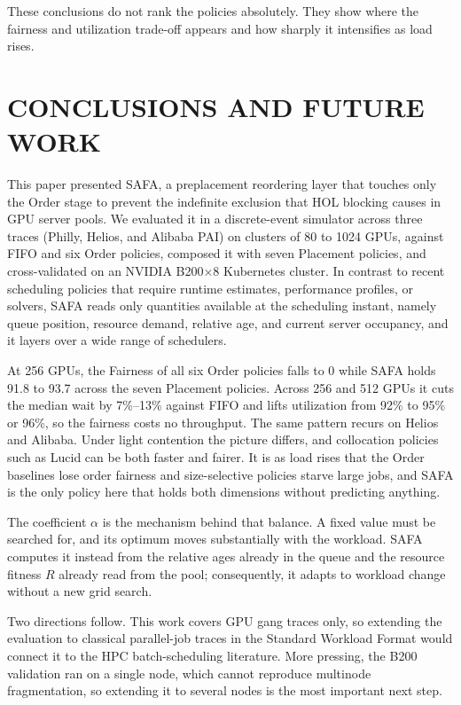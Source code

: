 \documentclass{ieeetj}
\begin{document}
These conclusions do not rank the policies absolutely. They show where the fairness and utilization trade-off appears and how sharply it intensifies as load rises.

\FloatBarrier

\section{CONCLUSIONS AND FUTURE WORK}\label{conclu}

This paper presented SAFA, a preplacement reordering layer that touches only the Order stage to prevent the indefinite exclusion that HOL blocking causes in GPU server pools. We evaluated it in a discrete-event simulator across three traces (Philly, Helios, and Alibaba PAI) on clusters of 80 to 1024 GPUs, against FIFO and six Order policies, composed it with seven Placement policies, and cross-validated on an NVIDIA B200$\times$8 Kubernetes cluster. In contrast to recent scheduling policies that require runtime estimates, performance profiles, or solvers, SAFA reads only quantities available at the scheduling instant, namely queue position, resource demand, relative age, and current server occupancy, and it layers over a wide range of schedulers.

At 256 GPUs, the Fairness of all six Order policies falls to 0 while SAFA holds 91.8 to 93.7 across the seven Placement policies. Across 256 and 512 GPUs it cuts the median wait by 7\%--13\% against FIFO and lifts utilization from 92\% to 95\% or 96\%, so the fairness costs no throughput. The same pattern recurs on Helios and Alibaba. Under light contention the picture differs, and collocation policies such as Lucid can be both faster and fairer. It is as load rises that the Order baselines lose order fairness and size-selective policies starve large jobs, and SAFA is the only policy here that holds both dimensions without predicting anything.

The coefficient $\alpha$ is the mechanism behind that balance. A fixed value must be searched for, and its optimum moves substantially with the workload. SAFA computes it instead from the relative ages already in the queue and the resource fitness $R$ already read from the pool; consequently, it adapts to workload change without a new grid search.

Two directions follow. This work covers GPU gang traces only, so extending the evaluation to classical parallel-job traces in the Standard Workload Format would connect it to the HPC batch-scheduling literature. More pressing, the B200 validation ran on a single node, which cannot reproduce multinode fragmentation, so extending it to several nodes is the most important next step.
\end{document}
